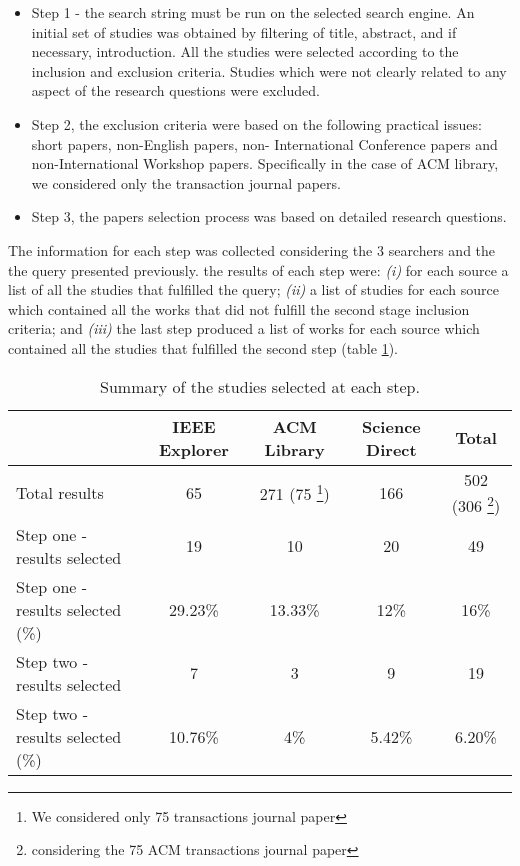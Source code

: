 \begin{itemize}
  \item Step 1 - the search string must be run on the selected
search engine. An initial set of studies was obtained by filtering
of title, abstract, and if necessary, introduction. All the studies were
selected according to the inclusion and exclusion criteria. Studies which
were not clearly related to any aspect of the research questions
were excluded.
\item Step 2, the exclusion criteria were based on the following
practical issues: short papers, non-English papers, non-
International Conference papers and non-International Workshop
papers. Specifically in the case of ACM library, we considered only the
transaction journal papers.
\item Step 3, the papers selection process was based on detailed
research questions.
\end{itemize}  

The information for each step was collected considering the 3 searchers
and the the query presented previously. the results of each step were:
\textit{(i)} for each source a list of all the studies that
fulfilled the query; \textit{(ii)} a list
of studies for each source which contained all the works that did not fulfill the
second stage inclusion criteria; and
\textit{(iii)} the last step produced a list of works for each source which
contained all the studies that fulfilled the second step (table
\ref{tab:result01}).

 
\begin{table}
\begin{tabular}{l|c|c|c|c}
  \hline
  \hline
   & IEEE Explorer & ACM Library & Science Direct & Total \\
  \hline
  \hline
  Total results & 65 & 271 (75 \footnote{We considered only 75 transactions
  journal paper}) & 166 & 502 (306 \footnote{considering the 75 ACM
  transactions journal paper}) \\ 
  \hline
  Step one - results selected & 19 & 10 & 20  & 49 \\
  Step one - results selected (\%) & 29.23\% & 13.33\% & 12\% &
  16\% \\ 
  \hline 
  Step two - results selected & 7 & 3 & 9 & 19\\
  Step two - results selected (\%)  & 10.76\% & 4\% & 5.42\% & 6.20\%\\ 
  \hline
  \hline
\end{tabular}
\caption{Summary of the studies selected at each step.}
\label{tab:result01}
\end{table} 

